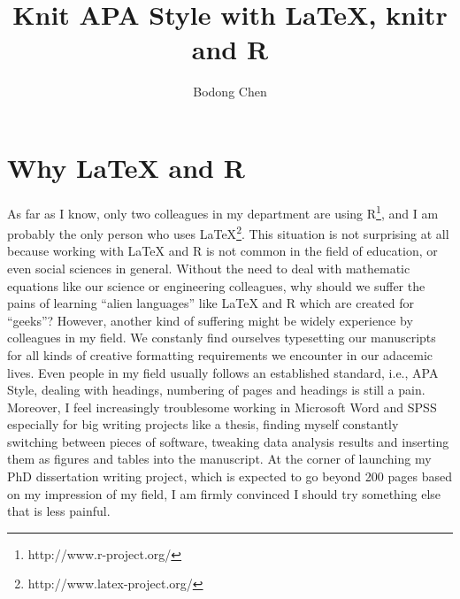 \documentclass[man]{apa6}\usepackage{knitr}
\title{Knit APA Style with \LaTeX, knitr and R}
\author{Bodong Chen}
\affiliation{University of Toronto}
\begin{document}
\maketitle





\section{Why LaTeX and R}

As far as I know, only two colleagues in my department are using R\footnote{http://www.r-project.org/}, and I am probably the only person who uses LaTeX\footnote{http://www.latex-project.org/}. 
This situation is not surprising at all because working with LaTeX and R is not common in the field of education, or even social sciences in general. 
Without the need to deal with mathematic equations like our science or engineering colleagues, why should we suffer the pains of learning ``alien languages'' like LaTeX and R which are created for ``geeks''?
However, another kind of suffering might be widely experience by colleagues in my field. 
We constanly find ourselves typesetting our manuscripts for all kinds of creative formatting requirements we encounter in our adacemic lives. 
Even people in my field usually follows an established standard, i.e., APA Style, dealing with headings, numbering of pages and headings is still a pain. 
Moreover, I feel increasingly troublesome working in Microsoft Word and SPSS especially for big writing projects like a thesis, finding myself constantly switching between pieces of software, tweaking data analysis results and inserting them as figures and tables into the manuscript.
At the corner of launching my PhD dissertation writing project, which is expected to go beyond 200 pages based on my impression of my field, I am firmly convinced I should try something else that is less painful.
\end{document}
